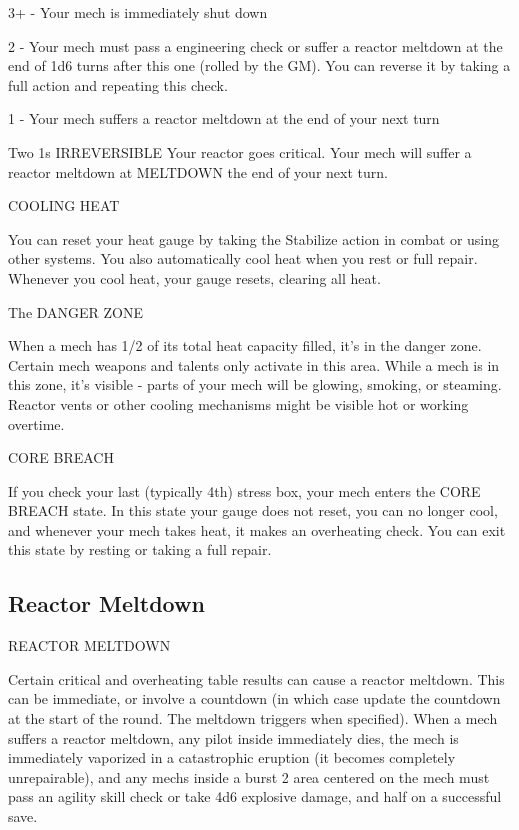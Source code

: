                                     3+ - Your mech is immediately shut down
 
                                    2 - Your mech must pass a engineering check or suffer a reactor  
                                    meltdown at the end of 1d6 turns after this one (rolled by the GM). You  
                                    can reverse it by taking a full action and repeating this check.
 
                                    1 - Your mech suffers a reactor meltdown at the end of your next turn 

 Two 1s     IRREVERSIBLE            Your reactor goes critical. Your mech will suffer a reactor meltdown at  
            MELTDOWN                the end of your next turn. 

                                               COOLING HEAT  

                                                                                                                


You can reset your heat gauge by taking the Stabilize action in combat or using other systems.  
You also automatically cool heat when you rest or full repair. Whenever you cool heat, your gauge  
resets, clearing all heat. 
 

                                            The DANGER ZONE  

When a mech has 1/2 of its total heat capacity filled, it’s in the danger zone. Certain mech  
weapons and talents only activate in this area. While a mech is in this zone, it’s visible - parts of  
your mech will be glowing, smoking, or steaming. Reactor vents or other cooling mechanisms  
might be visible hot or working overtime.
 

                                              CORE BREACH  

If you check your last (typically 4th) stress box, your mech enters the CORE BREACH state. In  
this state your gauge does not reset, you can no longer cool, and whenever your mech takes  
heat, it makes an overheating check. You can exit this state by resting or taking a full repair.

\subsection{Reactor Meltdown}

                                      REACTOR MELTDOWN  

Certain critical and overheating table results can cause a reactor meltdown. This can be  
immediate, or involve a countdown (in which case update the countdown at the start of the  
round. The meltdown triggers when specified). When a mech suffers a reactor meltdown, any  
pilot inside immediately dies, the mech is immediately vaporized in a catastrophic eruption (it  
becomes completely unrepairable), and any mechs inside a burst 2 area centered on the mech  
must pass an agility skill check or take 4d6 explosive damage, and half on a successful save.
 

                                                               